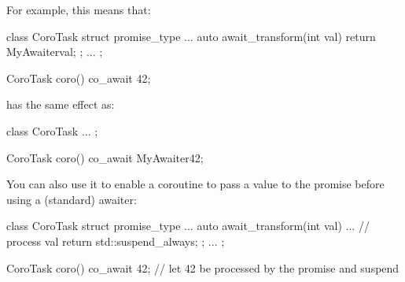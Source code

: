 For example, this means that:

\begin{cpp}
class CoroTask {
	struct promise_type {
		...
		auto await_transform(int val) {
			return MyAwaiter{val};
		}
	};
	...
};

CoroTask coro()
{
	co_await 42;
}
\end{cpp}

has the same effect as:

\begin{cpp}
class CoroTask {
	...
};

CoroTask coro()
{
	co_await MyAwaiter{42};
}
\end{cpp}

You can also use it to enable a coroutine to pass a value to the promise before using a (standard) awaiter:

\begin{cpp}
class CoroTask {
	struct promise_type {
		...
		auto await_transform(int val) {
			... // process val
			return std::suspend_always{};
		}
	};
	...
};

CoroTask coro()
{
	co_await 42; // let 42 be processed by the promise and suspend
}
\end{cpp}











